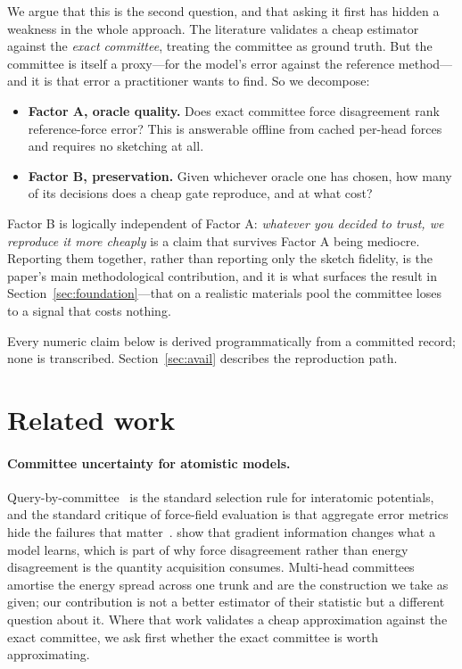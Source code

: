 We argue that this is the second question, and that asking it first has hidden a
weakness in the whole approach. The literature validates a cheap estimator
against the \emph{exact committee}, treating the committee as ground truth. But
the committee is itself a proxy---for the model's error against the reference
method---and it is that error a practitioner wants to find. So we decompose:

\begin{itemize}
\item \textbf{Factor A, oracle quality.} Does exact committee force disagreement
rank reference-force error? This is answerable offline from cached per-head
forces and requires no sketching at all.
\item \textbf{Factor B, preservation.} Given whichever oracle one has chosen, how
many of its decisions does a cheap gate reproduce, and at what cost?
\end{itemize}

Factor B is logically independent of Factor A: \emph{whatever you decided to
trust, we reproduce it more cheaply} is a claim that survives Factor A being
mediocre. Reporting them together, rather than reporting only the sketch fidelity,
is the paper's main methodological contribution, and it is what surfaces the
result in Section~\ref{sec:foundation}---that on a realistic materials pool the
committee loses to a signal that costs nothing.

Every numeric claim below is derived programmatically from a committed record;
none is transcribed. Section~\ref{sec:avail} describes the reproduction path.

\section{Related work}
\label{sec:related}

\paragraph{Committee uncertainty for atomistic models.}
Query-by-committee~\citep{seung1992query} is the standard selection rule for
interatomic potentials, and the standard critique of force-field evaluation is
that aggregate error metrics hide the failures that matter~\citep{kovacs2021beyond}.
\citet{christensen2020role} show that gradient information changes what a model
learns, which is part of why force disagreement rather than energy disagreement is
the quantity acquisition consumes. Multi-head committees~\citep{beck2025committee}
amortise the energy spread across one trunk and are the construction we take as
given; our contribution is not a better estimator of their statistic but a
different question about it. Where that work validates a cheap approximation
against the exact committee, we ask first whether the exact committee is worth
approximating.

